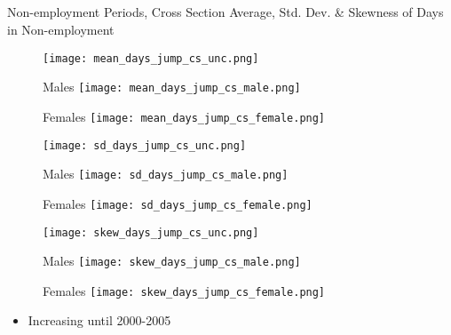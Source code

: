 \documentclass[hyperref={bookmarks=false}]{beamer}
\begin{document}
\begin{appendix}
\subsection{}

\begin{frame}
\label{NONEMP}
\end{frame}

\begin{frame}{Non-employment Periods, Cross Section}
Average, Std. Dev. \& Skewness of Days in Non-employment
\begin{figure}[!t]
\centering
\begin{minipage}[b]{0.30\textwidth}{}
\centering
\texttt{[image: mean\_days\_jump\_cs\_unc.png]}
\end{minipage}
\begin{minipage}[b]{0.30\textwidth}{Males}
\centering
\texttt{[image: mean\_days\_jump\_cs\_male.png]}
\end{minipage}
\begin{minipage}[b]{0.30\textwidth}{Females}
\centering
\texttt{[image: mean\_days\_jump\_cs\_female.png]}
\end{minipage}
\begin{minipage}[b]{0.30\textwidth}{}
\centering
\texttt{[image: sd\_days\_jump\_cs\_unc.png]}
\end{minipage}
\begin{minipage}[b]{0.30\textwidth}{Males}
\centering
\texttt{[image: sd\_days\_jump\_cs\_male.png]}
\end{minipage}
\begin{minipage}[b]{0.30\textwidth}{Females}
\centering
\texttt{[image: sd\_days\_jump\_cs\_female.png]}
\end{minipage}
\begin{minipage}[b]{0.30\textwidth}{}
\centering
\texttt{[image: skew\_days\_jump\_cs\_unc.png]}
\end{minipage}
\begin{minipage}[b]{0.30\textwidth}{Males}
\centering
\texttt{[image: skew\_days\_jump\_cs\_male.png]}
\end{minipage}
\begin{minipage}[b]{0.30\textwidth}{Females}
\centering
\texttt{[image: skew\_days\_jump\_cs\_female.png]}
\end{minipage}
\end{figure}
\begin{itemize}
\setlength{\itemsep}{0.7 cm}
\item Increasing until 2000-2005
\end{itemize}
\end{frame}


\end{appendix}
\end{document}
